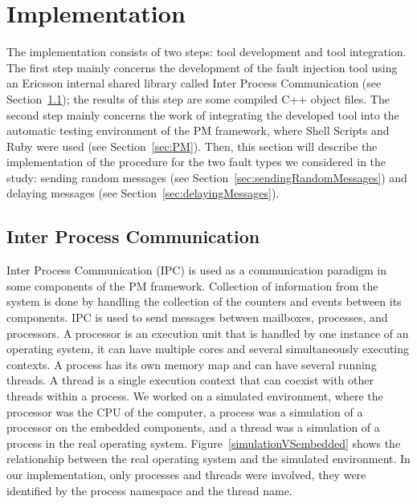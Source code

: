 \section{Implementation}\label{sec:implementation}

The implementation consists of two steps: tool development and tool integration. The first step mainly concerns the development of the fault injection tool using an Ericsson internal shared library called Inter Process Communication (see Section~\ref{sec:IPC}); the results of this step are some compiled C++ object files. The second step mainly concerns the work of integrating the developed tool into the automatic testing environment of the PM framework, where Shell Scripts and Ruby were used (see Section~\ref{sec:PM}). Then, this section will describe the implementation of the procedure for the two fault types we considered in the study: sending random messages (see Section~\ref{sec:sendingRandomMessages}) and delaying messages (see Section~\ref{sec:delayingMessages}).

\subsection{Inter Process Communication}\label{sec:IPC}
Inter Process Communication (IPC) is used as a communication paradigm in some components of the PM framework. Collection of information from the system is done by handling the collection of the counters and events between its components. %
 IPC is used to send messages between mailboxes, processes, and processors. A processor is an execution unit that is handled by one instance of an operating system, it can have multiple cores and several simultaneously executing contexts. A process has its own memory map and can have several running threads. A thread is a single execution context that can coexist with other threads within a process. We worked on a simulated environment, where the processor was the CPU of the computer, a process was a simulation of a processor on the embedded components,  and a thread was a simulation of a process in the real operating system. Figure~\ref{simulationVSembedded} shows the relationship between the real operating system and the simulated environment. In our implementation, only processes and threads were involved, they were identified by the process namespace and the thread name. %

